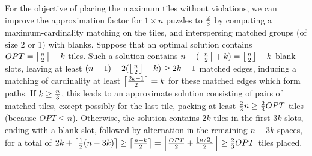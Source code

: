 \documentclass[11pt]{article}
\def\EMP{\mathrm{EMP}}
\newcommand{\TODO}[1]{{\color{xxxcolor}{[}\emph{#1}{]}}}
\begin{document}
For the objective of placing the maximum tiles without violations,
we can improve the approximation factor for $1 \times n$ puzzles
to ${2 \over 3}$ by computing a maximum-cardinality matching on the tiles,
and interspersing matched groups (of size 2 or 1) with blanks.
Suppose that an optimal solution contains $OPT = \left\lceil {n \over 2} \right\rceil + k$ tiles.
Such a solution contains $n - (\left\lceil {n \over 2} \right\rceil + k) = \left\lfloor {n \over 2} \right\rfloor - k$ blank slots, leaving at least $(n-1) - 2(\left\lfloor {n \over 2} \right\rfloor - k) \geq 2k - 1$ matched edges, inducing a matching of cardinality at least $\left\lceil {{2k-1} \over 2} \right\rceil = k$ for these matched edges which form paths.
If $k \geq {n \over 3}$, this leads to an approximate solution consisting of pairs of matched tiles, except possibly for the last tile, packing at least ${2 \over 3}n \geq {2 \over 3}OPT$ tiles (because $OPT \leq n$).
Otherwise, the solution contains $2k$ tiles in the first $3k$ slots, ending with a blank slot, followed by alternation in the remaining $n - 3k$ spaces, for a total of $2k + \left\lceil{1 \over 2} (n - 3k)\right\rceil \geq \left\lceil {{n+k} \over 2} \right\rceil = \left\lceil {OPT \over 2} + {{\left\lfloor n/2 \right\rfloor} \over 2}\right\rceil \geq {2 \over 3}OPT$ tiles placed.



\end{document}
